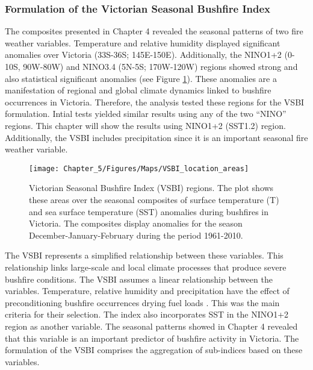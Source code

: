 \subsubsection{Formulation of the Victorian Seasonal Bushfire Index \label{sub:Formulation-VSBI}}

The composites presented in Chapter 4 revealed the seasonal patterns
of two fire weather variables. Temperature and relative humidity displayed
significant anomalies over Victoria (33S-36S; 145E-150E). Additionally,
the NINO1+2 (0-10S, 90W-80W) and NINO3.4 (5N-5S; 170W-120W) regions
showed strong and also statistical significant anomalies (see Figure
\ref{fig: Victorian Seasonal Bushfire Index (VSBI) regions}). These
anomalies are a manifestation of regional and global climate dynamics
linked to bushfire occurrences in Victoria. Therefore, the analysis
tested these regions for the VSBI formulation. Intial tests yielded
similar results using any of the two ``NINO'' regions. This chapter
will show the results using NINO1+2 (SST1.2) region. Additionally,
the VSBI includes precipitation since it is an important seasonal
fire weather variable.

\begin{figure}[h]
\noindent \begin{centering}
\texttt{[image: Chapter\_5/Figures/Maps/VSBI\_location\_areas]}
\par\end{centering}

\caption[Victorian Seasonal Bushfire Index (VSBI) regions]{Victorian Seasonal Bushfire Index (VSBI) regions. The plot shows these
areas over the seasonal composites of surface temperature (T) and
sea surface temperature (SST) anomalies during bushfires in Victoria.
The composites display anomalies for the season December-January-February
during the period 1961-2010. \label{fig: Victorian Seasonal Bushfire Index (VSBI) regions}}


\end{figure}


The VSBI represents a simplified relationship between these variables.
This relationship links large-scale and local climate processes that
produce severe bushfire conditions. The VSBI assumes a linear relationship
between the variables. Temperature, relative humidity and precipitation
have the effect of preconditioning bushfire occurrences drying fuel
loads \citep{BoM2009}. This was the main criteria for their selection.
The index also incorporates SST in the NINO1+2 region as another variable.
The seasonal patterns showed in Chapter 4 revealed that this variable
is an important predictor of bushfire activity in Victoria. The formulation
of the VSBI comprises the aggregation of sub-indices based on these
variables. 

